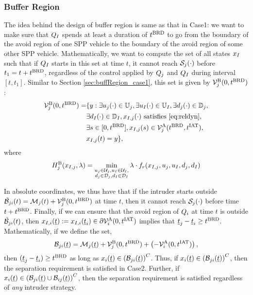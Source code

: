 \subsubsection{Buffer Region} \label{sec:buffRegion_case2}
The idea behind the design of buffer region is same as that in Case1: we want to make sure that $Q_{I}$ spends at least a duration of $t^\text{BRD}$ to go from the boundary of the avoid region of one SPP vehicle to the boundary of the avoid region of some other SPP vehicle. Mathematically, we want to compute the set of all states $x_{I}$ such that if $Q_{I}$ starts in this set at time $t$, it cannot reach $\mathcal{S}_j(\cdot)$ before $t_1 = t + t^\text{BRD}$, regardless of the control applied by $Q_j$ and $Q_{I}$ during interval $[t, t_1]$. Similar to Section \ref{sec:buffRegion_case1}, this set is given by $\mathcal{V}^{\text{B}}_{j}(0, t^\text{BRD})$: 
\begin{equation} \label{eqn:buffBRS_case1}
\begin{aligned}
\brs^{\text{B}}_{j}(0, \brd) = & \{y: \exists \ctrl_j(\cdot) \in \cfset_j, \exists \ctrl_\intr(\cdot) \in \cfset_\intr, \exists \dstb_j(\cdot) \in \dfset_j, \\
& \exists \dstb_\intr(\cdot) \in \dfset_\intr, \state_{\intr, j}(\cdot) \text{ satisfies \eqref{eq:reldyn}},\\
& \exists s \in [0, \brd], \state_{\intr, j}(s) \in \brs^{\text{A}}_{j}(\brd, \iat),\\
& \state_{\intr, j}(t) = y\},
\end{aligned}
\end{equation}
where 
\begin{equation}
H^{\text{B}}_{j}(x_{I, j}, \lambda) = \min_{\substack{u_j \in \mathcal{U}_j, u_I \in \mathcal{U}_I, \\ d_j \in \mathcal{D}_j, d_I \in \mathcal{D}_I}} \lambda \cdot f_r(x_{I, j}, u_j, u_I, d_j, d_I)
\end{equation}

In absolute coordinates, we thus have that if the intruder starts outside $\tilde{\mathcal{B}}_{ji}(t) = \mathcal{M}_j(t) + \mathcal{V}^{\text{B}}_{j}(0, t^\text{BRD})$ at time $t$, then it cannot reach $\mathcal{S}_j(\cdot)$ before time $t + t^\text{BRD}$. Finally, if we can ensure that the avoid region of $Q_i$ at time $t$ is outside $\tilde{\mathcal{B}}_{ji}(t)$, then $x_{I, i}(\underline{t}) := x_{I, i}(\underline{t}_i) \in \partial \mathcal{V}^{\text{A}}_{i}(0, t^\text{IAT})$ implies that $\underline{t}_j - \underline{t}_i \geq t^\text{BRD}$. Mathematically, if we define the set,  
\begin{equation} \label{eqn:buffRegion_case2}
\buff_{ji}(\tsa) = \boset_j(\tsa) + \brs^{\text{B}}_{j}(0, \brd) + \left(-\brs^{\text{A}}_{i}(0, \iat)\right),
\end{equation} 
then $(\underline{t}_j - \underline{t}_i) \geq t^\text{BRD}$ as long as $x_i(\underline{t}) \in \left(\mathcal{B}_{ji}(\underline{t})\right)^C$. Thus, if $x_i(\underline{t}) \in \left(\mathcal{B}_{ji}(\underline{t})\right)^C$, then the separation requirement is satisfied in Case2. Further, if $x_i(\underline{t}) \in \left(\mathcal{B}_{ji}(\underline{t}) \cup \mathcal{B}_{ij}(\underline{t})\right)^C$, then the separation requirement is satisfied regardless of \textit{any} intruder strategy.
